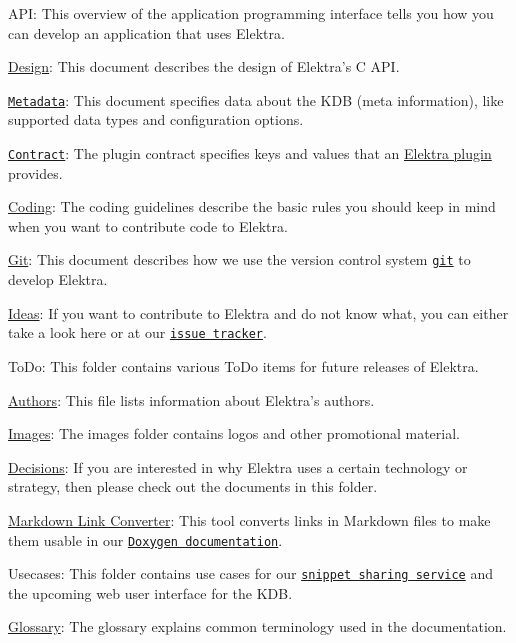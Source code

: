 \begin{DoxyItemize}
\item A\+PI\+: This overview of the application programming interface tells you how you can develop an application that uses Elektra.
\item \hyperlink{doc_DESIGN_md}{Design}\+: This document describes the design of Elektra’s C A\+PI.
\end{DoxyItemize}


\begin{DoxyItemize}
\item \href{/home/jenkins/workspace/libelektra-release/doc/METADATA.ini}{\tt Metadata}\+: This document specifies data about the K\+DB (meta information), like supported data types and configuration options.
\item \href{/home/jenkins/workspace/libelektra-release/doc/CONTRACT.ini}{\tt Contract}\+: The plugin contract specifies keys and values that an \hyperlink{src_plugins_README_md}{Elektra plugin} provides.
\end{DoxyItemize}


\begin{DoxyItemize}
\item \hyperlink{doc_CODING_md}{Coding}\+: The coding guidelines describe the basic rules you should keep in mind when you want to contribute code to Elektra.
\item \hyperlink{doc_GIT_md}{Git}\+: This document describes how we use the version control system \href{https://git-scm.com}{\tt git} to develop Elektra.
\item \hyperlink{doc_IDEAS_md}{Ideas}\+: If you want to contribute to Elektra and do not know what, you can either take a look here or at our \href{http://libelektra.org/issues}{\tt issue tracker}.
\item To\+Do\+: This folder contains various To\+Do items for future releases of Elektra.
\item \hyperlink{doc_AUTHORS_md}{Authors}\+: This file lists information about Elektra’s authors.
\end{DoxyItemize}


\begin{DoxyItemize}
\item \hyperlink{doc_images_README_md}{Images}\+: The images folder contains logos and other promotional material.
\item \hyperlink{doc_decisions_README_md}{Decisions}\+: If you are interested in why Elektra uses a certain technology or strategy, then please check out the documents in this folder.
\item \hyperlink{doc_markdownlinkconverter_README_md}{Markdown Link Converter}\+: This tool converts links in Markdown files to make them usable in our \href{https://doc.libelektra.org/api/latest/html}{\tt Doxygen documentation}.
\item Usecases\+: This folder contains use cases for our \href{https://www.libelektra.org/auth/login}{\tt snippet sharing service} and the upcoming web user interface for the K\+DB.
\item \hyperlink{doc_help_elektra-glossary_md}{Glossary}\+: The glossary explains common terminology used in the documentation. 
\end{DoxyItemize}
